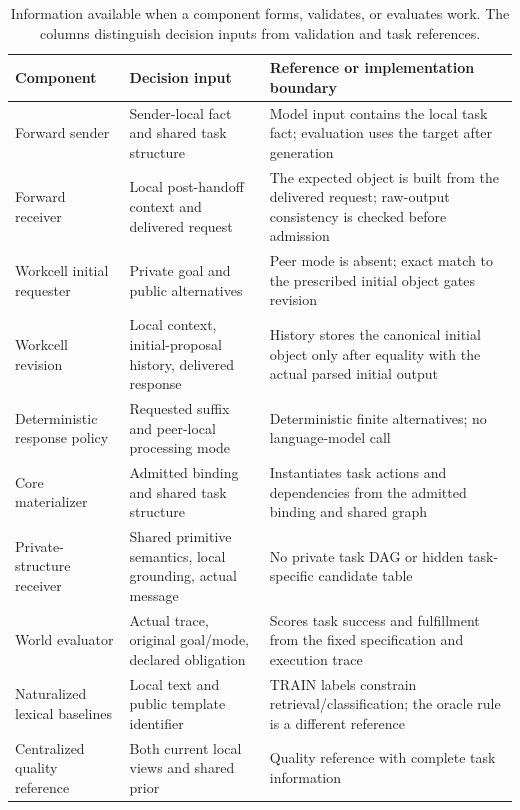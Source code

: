 \documentclass[sigconf,nonacm,balance=false]{aamas}
\newcommand{\tabstyle}{\small\setlength{\tabcolsep}{3pt}\renewcommand{\arraystretch}{1.10}}
\begin{document}
\begin{table}[!htbp]
\centering\tabstyle
\caption{Information available when a component forms, validates, or evaluates work. The columns distinguish decision inputs from validation and task references.}
\label{tab:access-map-new}
\begin{tabularx}{\textwidth}{@{}L{3.25cm}ZZ@{}}
\toprule
Component & Decision input & Reference or implementation boundary\\
\midrule
Forward sender & Sender-local fact and shared task structure & Model input contains the local task fact; evaluation uses the target after generation\\
Forward receiver & Local post-handoff context and delivered request & The expected object is built from the delivered request; raw-output consistency is checked before admission\\
Workcell initial requester & Private goal and public alternatives & Peer mode is absent; exact match to the prescribed initial object gates revision\\
Workcell revision & Local context, initial-proposal history, delivered response & History stores the canonical initial object only after equality with the actual parsed initial output\\
Deterministic response policy & Requested suffix and peer-local processing mode & Deterministic finite alternatives; no language-model call\\
Core materializer & Admitted binding and shared task structure & Instantiates task actions and dependencies from the admitted binding and shared graph\\
Private-structure receiver & Shared primitive semantics, local grounding, actual message & No private task DAG or hidden task-specific candidate table\\
World evaluator & Actual trace, original goal/mode, declared obligation & Scores task success and fulfillment from the fixed specification and execution trace\\
Naturalized lexical baselines & Local text and public template identifier & TRAIN labels constrain retrieval/classification; the oracle rule is a different reference\\
Centralized quality reference & Both current local views and shared prior & Quality reference with complete task information\\
\bottomrule
\end{tabularx}
\end{table}
\end{document}
